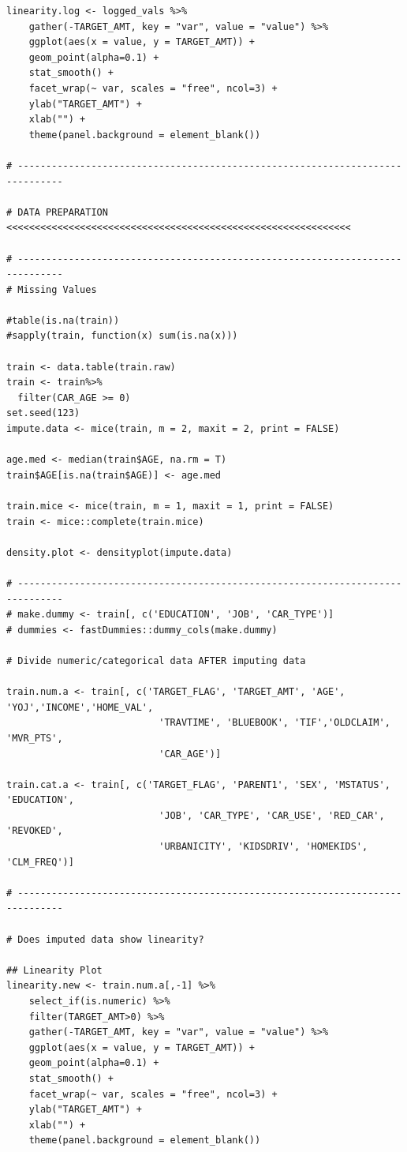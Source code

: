 \documentclass[]{article}
\begin{document}
\begin{verbatim}
linearity.log <- logged_vals %>%
    gather(-TARGET_AMT, key = "var", value = "value") %>%
    ggplot(aes(x = value, y = TARGET_AMT)) +
    geom_point(alpha=0.1) +
    stat_smooth() +
    facet_wrap(~ var, scales = "free", ncol=3) +
    ylab("TARGET_AMT") +
    xlab("") +
    theme(panel.background = element_blank())

# ------------------------------------------------------------------------------

# DATA PREPARATION <<<<<<<<<<<<<<<<<<<<<<<<<<<<<<<<<<<<<<<<<<<<<<<<<<<<<<<<<<<<<

# ------------------------------------------------------------------------------
# Missing Values

#table(is.na(train))
#sapply(train, function(x) sum(is.na(x)))

train <- data.table(train.raw)
train <- train%>%
  filter(CAR_AGE >= 0)
set.seed(123)
impute.data <- mice(train, m = 2, maxit = 2, print = FALSE)

age.med <- median(train$AGE, na.rm = T)
train$AGE[is.na(train$AGE)] <- age.med

train.mice <- mice(train, m = 1, maxit = 1, print = FALSE)
train <- mice::complete(train.mice)

density.plot <- densityplot(impute.data)

# ------------------------------------------------------------------------------
# make.dummy <- train[, c('EDUCATION', 'JOB', 'CAR_TYPE')]
# dummies <- fastDummies::dummy_cols(make.dummy)

# Divide numeric/categorical data AFTER imputing data

train.num.a <- train[, c('TARGET_FLAG', 'TARGET_AMT', 'AGE', 'YOJ','INCOME','HOME_VAL',
                           'TRAVTIME', 'BLUEBOOK', 'TIF','OLDCLAIM', 'MVR_PTS',
                           'CAR_AGE')]

train.cat.a <- train[, c('TARGET_FLAG', 'PARENT1', 'SEX', 'MSTATUS', 'EDUCATION',
                           'JOB', 'CAR_TYPE', 'CAR_USE', 'RED_CAR', 'REVOKED',
                           'URBANICITY', 'KIDSDRIV', 'HOMEKIDS', 'CLM_FREQ')]

# ------------------------------------------------------------------------------

# Does imputed data show linearity?

## Linearity Plot
linearity.new <- train.num.a[,-1] %>%
    select_if(is.numeric) %>%
    filter(TARGET_AMT>0) %>%
    gather(-TARGET_AMT, key = "var", value = "value") %>%
    ggplot(aes(x = value, y = TARGET_AMT)) +
    geom_point(alpha=0.1) +
    stat_smooth() +
    facet_wrap(~ var, scales = "free", ncol=3) +
    ylab("TARGET_AMT") +
    xlab("") +
    theme(panel.background = element_blank())


\end{verbatim}
\end{document}

